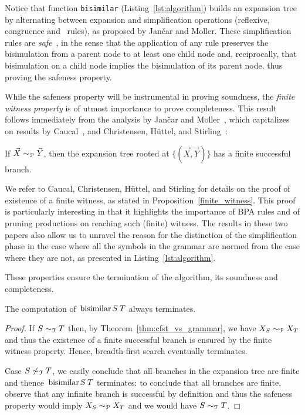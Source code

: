 Notice that function \lstinline|bisimilar|
(Listing~\ref{lst:algorithm}) builds an expansion tree by alternating
between expansion and simplification operations (reflexive,
congruence and \BPA\ rules), as proposed by Jan{\v{c}}ar and Moller.
%
These simplification rules are \emph{safe}~\cite{janvcar1999techniques}, in the sense that the
application of any rule preserves the bisimulation from a parent node
to at least one child node and, reciprocally, that bisimulation on a
child node implies the bisimulation of its parent node, thus proving
the safeness property.

While the safeness property will be instrumental in proving
soundness, the \emph{finite witness property} is of
utmost importance to prove completeness. This result follows
immediately from the analysis by Jan{\v{c}}ar and
Moller~\cite{janvcar1999techniques}, which capitalizes on results by
Caucal~\cite{caucal1986decidabilite}, and Christensen, H{\"{u}}ttel, and
Stirling~\cite{DBLP:journals/iandc/ChristensenHS95}:

\begin{proposition} 
\label{finite_witness}
	If $\vec X \sim_\mathcal P \vec Y$, then the expansion tree rooted at
	$\{(\vec X, \vec Y)\}$ has a finite successful branch.
\end{proposition}

We refer to Caucal, Christensen, H{\"{u}}ttel, and Stirling for
details on the proof of existence of a finite witness, as stated in
Proposition~\ref{finite_witness}. This proof is particularly
interesting in that it highlights the importance of BPA rules and of
pruning productions on reaching such (finite) witness. The results in
these two papers also allow us to unravel the reason for the
distinction of the simplification phase in the case where all the
symbols in the grammar are normed from the case where they are not, as
presented in Listing~\ref{lst:algorithm}.

These properties ensure the termination of the algorithm, its soundness
and completeness.

\begin{lemma}
\label{lemma:terminates}
	The computation of $\bisimf S T$ always terminates.
\end{lemma}

\begin{proof}
	If $S\sim_\mathcal T T$ then, by Theorem~\ref{thm:cfst_vs_grammar},
	we have $X_S\sim_\mathcal P X_T$ and thus the existence of a finite
	successful branch is ensured by the finite witness property. 
	Hence, breadth-first search eventually terminates. 
	
	Case $S\not\sim_\mathcal T T$, we easily conclude that all branches 
	in the expansion tree are finite and thence $\bisimf S T$ terminates: 
	to conclude that all branches are finite, observe that 
	any infinite branch is successful by definition and thus the 
	safeness property would imply $X_S\sim_\mathcal P X_T$ and
	we would have $S\sim_\mathcal T T$.
\end{proof}


